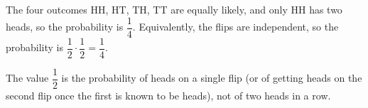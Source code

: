 The four outcomes HH, HT, TH, TT are equally likely, and only HH has two heads, so the probability is $\boxed{\dfrac14}$. Equivalently, the flips are independent, so the probability is $\dfrac12\cdot\dfrac12=\dfrac14$.

The value $\dfrac12$ is the probability of heads on a single flip (or of getting heads on the second flip once the first is known to be heads), not of two heads in a row.
